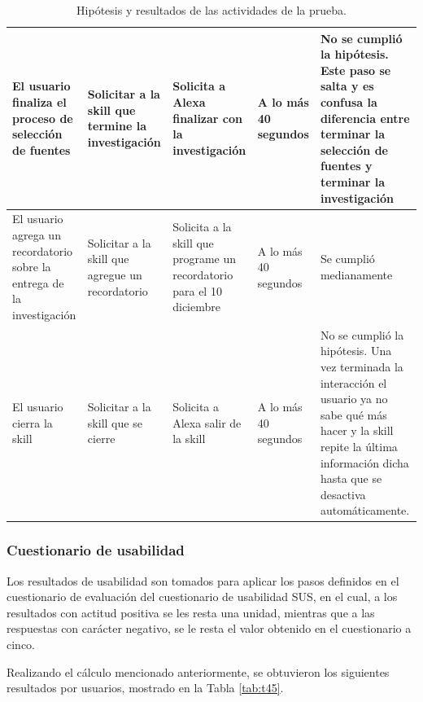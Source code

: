 \begin{table}[H]
  \begin{center}
    \begin{tabular}{ | p{3cm} | p{3cm} | p{3cm} | p{2cm} | p{4cm} | }
      \hline
      El usuario finaliza el proceso de selección de fuentes & Solicitar a la skill que termine la investigación & Solicita a Alexa finalizar con la investigación & A lo más 40 segundos & No se cumplió la hipótesis. Este paso se salta y es confusa la diferencia entre terminar la selección de fuentes y terminar la investigación \\ \hline
      El usuario agrega un recordatorio sobre la entrega de la investigación & Solicitar a la skill que agregue un recordatorio & Solicita a la skill que programe un recordatorio para el 10 diciembre & A lo más 40 segundos & Se cumplió medianamente \\ \hline
      El usuario cierra la skill & Solicitar a la skill que se cierre & Solicita a Alexa salir de la skill & A lo más 40 segundos & No se cumplió la hipótesis. Una vez terminada la interacción el usuario ya no sabe qué más hacer y la skill repite la última información dicha hasta que se desactiva automáticamente. \\ \hline
    \end{tabular}
    \caption{Hipótesis y resultados de las actividades de la prueba.}
    \label{tab:t44}
  \end{center}
\end{table}


\subsubsection{Cuestionario de usabilidad}
\label{CuestionarioUsabilidadcapIV}

Los resultados de usabilidad son tomados para aplicar los pasos definidos en el cuestionario de evaluación del cuestionario de usabilidad SUS, en el cual, a los resultados con actitud positiva se les resta una unidad, mientras que a las respuestas con carácter negativo, se le resta el valor obtenido en el cuestionario a cinco.

Realizando el cálculo mencionado anteriormente, se obtuvieron los siguientes resultados por usuarios, mostrado en la Tabla \ref{tab:t45}.

